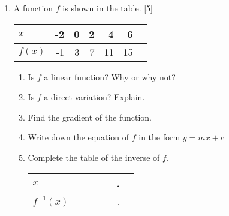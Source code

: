 \documentclass[12pt, twoside]{article}
\begin{document}
\begin{enumerate}
\newpage
\item A function $f$ is shown in the table. \hfill [5]
  \begin{center}
    \begin{tabular}{|l|r|r|r|r|r|r|}
      \hline
      $x$ & -2 & 0 & 2 & 4 & 6\\ 
      \hline 
      $f(x)$ & -1 & 3 & 7 & 11 & 15\\ 
      \hline 
    \end{tabular}
  \end{center}
  \begin{enumerate}[itemsep=2.5cm]
    \item Is $f$ a linear function? Why or why not?
    \item Is $f$ a direct variation? Explain.
    \item Find the gradient of the function. \vspace{1cm}
    \item Write down the equation of $f$ in the form $y=mx+c$
    \item Complete the table of the inverse of $f$.
      \begin{center}
        \begin{tabular}{|l|r|r|r|r|r|r|}
          \hline
          $x$ & \hspace{1cm} & \hspace{1cm} & \hspace{1cm} & \hspace{1cm} & \hspace{1cm}.\\[1cm] 
          \hline 
          $f^{-1}(x)$ & \hspace{1cm} & \hspace{1cm} & \hspace{1cm} & \hspace{1cm} & \hspace{1cm}.\\[1cm] 
          \hline 
        \end{tabular}
      \end{center}
  \end{enumerate}

\newpage


\end{enumerate}
\end{document}
